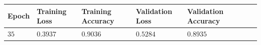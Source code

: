 \documentclass[11pt,a4paper]{article}
\begin{document}
\begin{center}
\hspace*{-0.8cm}
\begin{tabular}{|p{1.2cm}|p{1.8cm}|p{2cm}|p{2cm}|p{2cm}|p{2cm}|p{2cm}|}
\rowcolor{gray!50}
\hline
\textbf{Epoch} & \textbf{Training Loss} & \textbf{Training Accuracy} & \textbf{Validation Loss} & \textbf{Validation Accuracy}\\
\hline
$35$ & $0.3937$ & $0.9036$ & $0.5284$ & $0.8935$\\
\hline
\end{tabular}\\
\end{center}
\begin{figure}[H]
    \centering
    \qquad

\end{figure}
\end{document}

